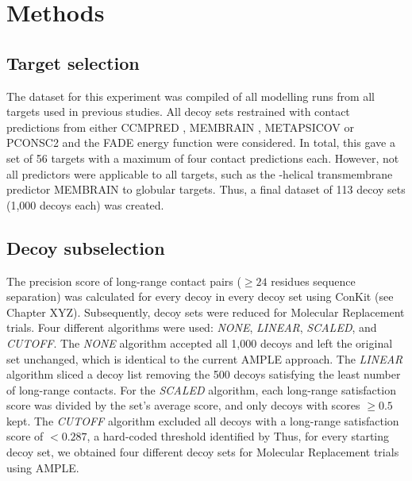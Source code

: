 
\section{Methods}

\subsection{Target selection}

The dataset for this experiment was compiled of all modelling runs from all targets used in previous studies. All decoy sets restrained with contact predictions from either CCMPRED \cite{Seemayer2014-ml}, MEMBRAIN \cite{Yang2013-lv}, METAPSICOV \cite{Jones2015-wp} or PCONSC2 \cite{Skwark2014-mu} and the FADE energy function were considered. In total, this gave a set of 56 targets with a maximum of four contact predictions each. However, not all predictors were applicable to all targets, such as the \textalpha-helical transmembrane predictor MEMBRAIN \cite{Yang2013-lv} to globular targets. Thus, a final dataset of 113 decoy sets (1,000 decoys each) was created.

\subsection{Decoy subselection}

The precision score of long-range contact pairs ($\geq24$ residues sequence separation) was calculated for every decoy in every decoy set using ConKit (see Chapter XYZ). Subsequently, decoy sets were reduced for Molecular Replacement trials. Four different algorithms were used: \textit{NONE}, \textit{LINEAR}, \textit{SCALED}, and \textit{CUTOFF}. The \textit{NONE} algorithm accepted all 1,000 decoys and left the original set unchanged, which is identical to the current AMPLE approach. The \textit{LINEAR} algorithm sliced a decoy list removing the 500 decoys satisfying the least number of long-range contacts. For the \textit{SCALED} algorithm, each long-range satisfaction score was divided by the set's average score, and only decoys with scores $\geq0.5$ kept. The \textit{CUTOFF} algorithm excluded all decoys with a long-range satisfaction score of $<0.287$, a hard-coded threshold identified by \cite{De_Oliveira2017-yf} Thus, for every starting decoy set, we obtained four different decoy sets for Molecular Replacement trials using AMPLE.

